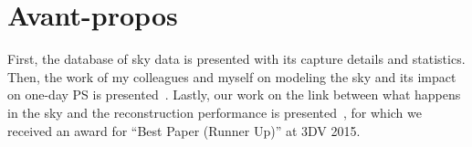 \chapter*{Avant-propos}         %

First, the database of sky data is presented with its capture details and statistics. Then, the work of my colleagues and myself on modeling the sky and its impact on one-day PS is presented~\cite{holdgeoffroy-iccp-15}. Lastly, our work on the link between what happens in the sky and the reconstruction performance is presented~\cite{holdgeoffroy-3dv-15}, for which we received an award for ``Best Paper (Runner Up)'' at 3DV 2015.
